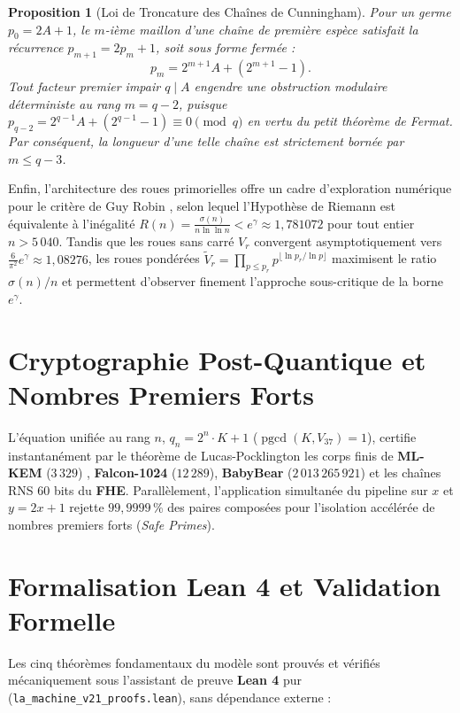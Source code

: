 \documentclass[11pt,a4paper]{article}
\DeclareMathOperator{\pgcd}{pgcd}
\newtheorem{proposition}{Proposition}
\begin{document}
\begin{proposition}[Loi de Troncature des Chaînes de Cunningham]
Pour un germe $p_0 = 2A + 1$, le $m$-ième maillon d'une chaîne de première espèce satisfait la récurrence $p_{m+1} = 2p_m + 1$, soit sous forme fermée :
\begin{equation}
p_m = 2^{m+1} A + (2^{m+1} - 1).
\end{equation}
Tout facteur premier impair $q \mid A$ engendre une obstruction modulaire déterministe au rang $m = q - 2$, puisque $p_{q-2} = 2^{q-1} A + (2^{q-1} - 1) \equiv 0 \pmod q$ en vertu du petit théorème de Fermat. Par conséquent, la longueur d'une telle chaîne est strictement bornée par $m \leq q - 3$.
\end{proposition}

Enfin, l'architecture des roues primorielles offre un cadre d'exploration numérique pour le critère de Guy Robin \cite{robin1984}, selon lequel l'Hypothèse de Riemann est équivalente à l'inégalité $R(n) = \frac{\sigma(n)}{n \ln \ln n} < e^\gamma \approx 1{,}781072$ pour tout entier $n > 5\,040$. Tandis que les roues sans carré $V_r$ convergent asymptotiquement vers $\frac{6}{\pi^2} e^\gamma \approx 1{,}08276$, les roues pondérées $\widetilde{V}_r = \prod_{p \leq p_r} p^{\lfloor \ln p_r / \ln p \rfloor}$ maximisent le ratio $\sigma(n)/n$ et permettent d'observer finement l'approche sous-critique de la borne $e^\gamma$.

\section{Cryptographie Post-Quantique et Nombres Premiers Forts}

L'équation unifiée au rang $n$, $q_n = 2^n \cdot K + 1$ ($\pgcd(K, V_{37}) = 1$), certifie instantanément par le théorème de Lucas-Pocklington \cite{lucas1876, pocklington1914} les corps finis de \textbf{ML-KEM} ($3\,329$) \cite{nist2024}, \textbf{Falcon-1024} ($12\,289$), \textbf{BabyBear} ($2\,013\,265\,921$) et les chaînes RNS 60 bits du \textbf{FHE}. Parallèlement, l'application simultanée du pipeline sur $x$ et $y = 2x + 1$ rejette \textbf{$99{,}9999\,\%$} des paires composées pour l'isolation accélérée de nombres premiers forts (\emph{Safe Primes}).

\section{Formalisation Lean 4 et Validation Formelle}

Les cinq théorèmes fondamentaux du modèle sont prouvés et vérifiés mécaniquement sous l'assistant de preuve \textbf{Lean 4} pur (\texttt{la\_machine\_v21\_proofs.lean}), sans dépendance externe :
\end{document}
